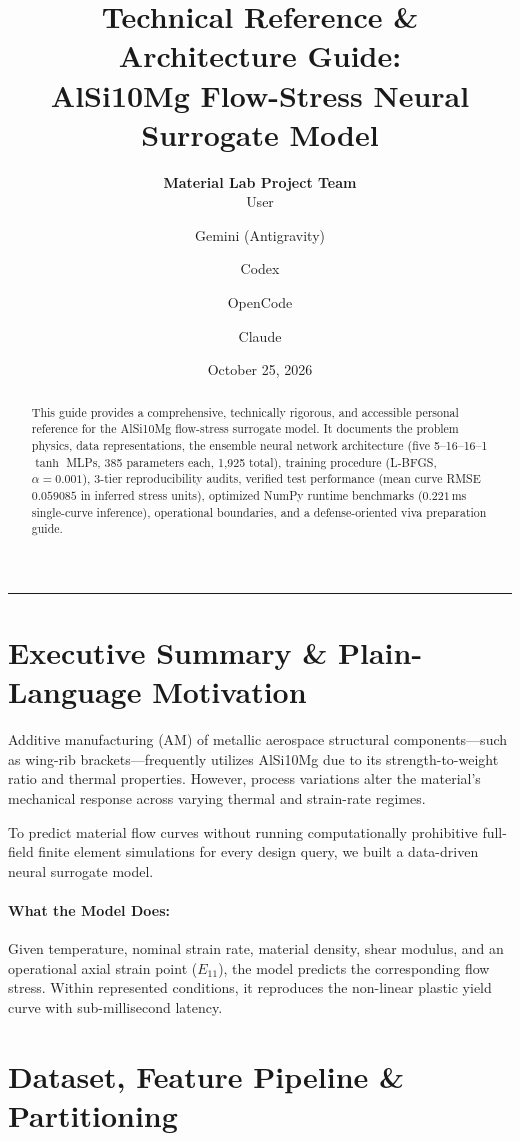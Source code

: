 \documentclass[11pt,a4paper]{article}
\title{\textbf{Technical Reference \& Architecture Guide:}\\
\Large AlSi10Mg Flow-Stress Neural Surrogate Model}
\author{\textbf{Material Lab Project Team}\\
\small User \and Gemini (Antigravity) \and Codex \and OpenCode \and Claude}
\date{October 25, 2026}
\begin{document}
\maketitle

\begin{abstract}
This guide provides a comprehensive, technically rigorous, and accessible personal reference for the AlSi10Mg flow-stress surrogate model. It documents the problem physics, data representations, the ensemble neural network architecture (five 5--16--16--1 $\tanh$ MLPs, 385 parameters each, 1,925 total), training procedure (L-BFGS, $\alpha=0.001$), 3-tier reproducibility audits, verified test performance (mean curve RMSE $0.059085$ in inferred stress units), optimized NumPy runtime benchmarks ($0.221\,\text{ms}$ single-curve inference), operational boundaries, and a defense-oriented viva preparation guide.
\end{abstract}

\tableofcontents
\vspace{1em}
\hrule
\vspace{1.5em}

\section{Executive Summary \& Plain-Language Motivation}

Additive manufacturing (AM) of metallic aerospace structural components—such as wing-rib brackets—frequently utilizes AlSi10Mg due to its strength-to-weight ratio and thermal properties. However, process variations alter the material's mechanical response across varying thermal and strain-rate regimes.

To predict material flow curves without running computationally prohibitive full-field finite element simulations for every design query, we built a data-driven neural surrogate model.

\paragraph{What the Model Does:}
Given temperature, nominal strain rate, material density, shear modulus, and an operational axial strain point ($E_{11}$), the model predicts the corresponding flow stress. Within represented conditions, it reproduces the non-linear plastic yield curve with sub-millisecond latency.

\section{Dataset, Feature Pipeline \& Partitioning}
\end{document}
